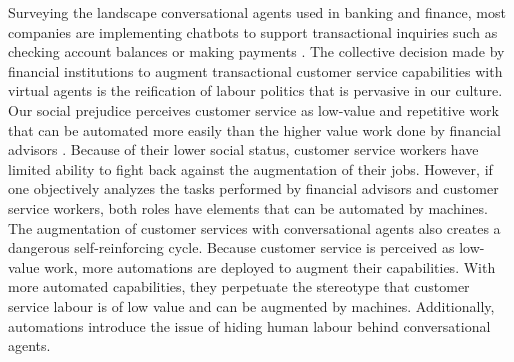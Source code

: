 \documentclass{sigchi-ext}
\begin{document}
Surveying the landscape conversational agents used in banking and finance, most companies are implementing chatbots to support transactional inquiries such as checking account balances or making payments \cite{chatbotguide}. The collective decision made by financial institutions to augment transactional customer service capabilities with virtual agents is the reification of labour politics that is pervasive in our culture. Our social prejudice perceives customer service as low-value and repetitive work that can be automated more easily than the higher value work done by financial advisors \cite{dhaliwal2022cyber}. Because of their lower social status, customer service workers have limited ability to fight back against the augmentation of their jobs. However, if one objectively analyzes the tasks performed by financial advisors and customer service workers, both roles have elements that can be automated by machines. The augmentation of customer services with conversational agents also creates a dangerous self-reinforcing cycle. Because customer service is perceived as low-value work, more automations are deployed to augment their capabilities. With more automated capabilities, they perpetuate the stereotype that customer service labour is of low value and can be augmented by machines. Additionally, automations introduce the issue of hiding human labour behind conversational agents.
\end{document}
